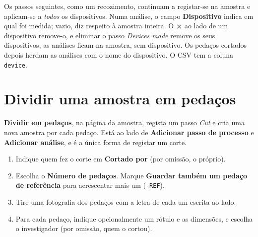 \documentclass[11pt,a4paper]{article}
\newcommand{\ui}[1]{\textsf{\textbf{#1}}}
\newcommand{\sid}[1]{\texttt{#1}}
\begin{document}
Os passos seguintes, como um recozimento, continuam a registar-se na amostra
e aplicam-se a \emph{todos} os dispositivos. Numa análise, o campo
\ui{Dispositivo} indica em qual foi medida; vazio, diz respeito à amostra
inteira. O \ui{×} ao lado de um dispositivo remove-o, e eliminar o passo
\emph{Devices made} remove os seus dispositivos; as análises ficam na
amostra, sem dispositivo. Os pedaços cortados depois herdam as análises com o
nome do dispositivo. O CSV tem a coluna \texttt{device}.

\section{Dividir uma amostra em pedaços}
\label{sec:cut}

\ui{Dividir em pedaços}, na página da amostra, regista um passo \emph{Cut}
e cria uma nova amostra por cada pedaço. Está ao lado de
\ui{Adicionar passo de processo} e \ui{Adicionar análise}, e é a única
forma de registar um corte.

\begin{enumerate}
  \item Indique quem fez o corte em \ui{Cortado por} (por omissão, o próprio).
  \item Escolha o \ui{Número de pedaços}. Marque \ui{Guardar também um
        pedaço de referência} para acrescentar mais um (\sid{-REF}).
  \item Tire uma fotografia dos pedaços com a letra de cada um escrita ao lado.
  \item Para cada pedaço, indique opcionalmente um rótulo e as dimensões, e
        escolha o investigador (por omissão, quem o cortou).
\end{enumerate}

\begin{center}
\end{center}
\end{document}

